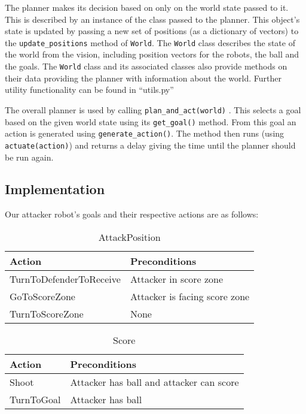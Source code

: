 The planner makes its decision based on only on the world state passed to it. This is described by an instance of the  class passed to the planner. This object's state is updated by passing a new set of positions (as a dictionary of vectors) to the \texttt{update\_positions} method of \texttt{World}. The \texttt{World} class describes the state of the world from the vision, including position vectors for the robots, the ball and the goals. The \texttt{World} class and its associated classes also provide methods on their data providing the planner with information about the world. Further utility functionality can be found in ``utils.py''

The overall planner is used by calling \texttt{plan\_and\_act(world)}
. This selects a goal based on the given world state  using its \texttt{get\_goal()} method. From this goal an action is generated using \texttt{generate\_action()}. The method then runs (using \texttt{actuate(action)}) and returns a delay giving the time until the planner should be run again.

\subsection{Implementation}

Our attacker robot's goals and their respective actions are as follows:

\begin{table}[H]
\centering
\caption{AttackPosition}
\begin{tabular}{ | l | l | }
\hline
Action & Preconditions \\ \hline
TurnToDefenderToReceive & Attacker in score zone \\ \hline
GoToScoreZone & Attacker is facing score zone  \\ \hline
TurnToScoreZone & None \\
\hline
\end{tabular}
\end{table}


\begin{table}[H]
\centering
\caption{Score}
\begin{tabular}{ | l | l | }
\hline
Action & Preconditions \\ \hline
Shoot & Attacker has ball and attacker can score \\ \hline
TurnToGoal & Attacker has ball \\
\hline
\end{tabular}
\end{table}



